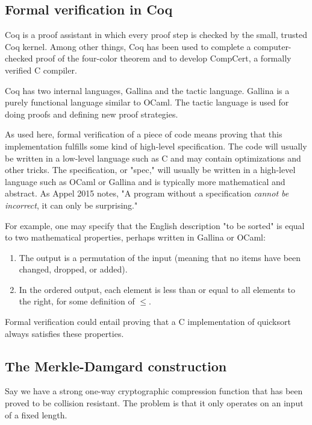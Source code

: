\documentclass[twocolumn,showpacs,%
  nofootinbib,aps,superscriptaddress,%
  eqsecnum,prd,notitlepage,showkeys,10pt]{revtex4-1}
\begin{document}
\subsection{Formal verification in Coq}

Coq is a proof assistant in which every proof step is checked by the small, trusted Coq kernel. Among other things, Coq has been used to complete a computer-checked proof of the four-color theorem and to  develop CompCert, a formally verified C compiler.

Coq has two internal languages, Gallina and the tactic language. Gallina is a purely functional language similar to OCaml. The tactic language is used for doing proofs and defining new proof strategies.

As used here, formal verification of a piece of code means proving that this implementation fulfills some kind of high-level specification. The code will usually be written in a low-level language such as C and may contain optimizations and other tricks. The specification, or "spec," will usually be written in a high-level language such as OCaml or Gallina and is typically more mathematical and abstract. As Appel 2015 notes, "A program without a specification {\it cannot be incorrect}, it can only be surprising."

For example, one may specify that the English description "to be sorted" is equal to two mathematical properties, perhaps written in Gallina or OCaml:

\begin{enumerate}
\item The output is a permutation of the input (meaning that no items have been changed, dropped, or added).
\item In the ordered output, each element is less than or equal to all elements to the right, for some definition of $\leq$.
\end{enumerate}

Formal verification could entail proving that a C implementation of quicksort always satisfies these properties.

\subsection{The Merkle-Damgard construction}
Say we have a strong one-way cryptographic compression function that has been proved to be collision resistant. The problem is that it only operates on an input of a fixed length.
\end{document}

